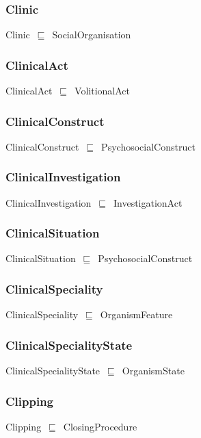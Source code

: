 \documentclass{article}
\begin{document}
\subsubsection*{Clinic}

Clinic~\ensuremath{\sqsubseteq}~SocialOrganisation~

\subsubsection*{ClinicalAct}

ClinicalAct~\ensuremath{\sqsubseteq}~VolitionalAct~

\subsubsection*{ClinicalConstruct}

ClinicalConstruct~\ensuremath{\sqsubseteq}~PsychosocialConstruct~

\subsubsection*{ClinicalInvestigation}

ClinicalInvestigation~\ensuremath{\sqsubseteq}~InvestigationAct~

\subsubsection*{ClinicalSituation}

ClinicalSituation~\ensuremath{\sqsubseteq}~PsychosocialConstruct~

\subsubsection*{ClinicalSpeciality}

ClinicalSpeciality~\ensuremath{\sqsubseteq}~OrganismFeature~

\subsubsection*{ClinicalSpecialityState}

ClinicalSpecialityState~\ensuremath{\sqsubseteq}~OrganismState~

\subsubsection*{Clipping}

Clipping~\ensuremath{\sqsubseteq}~ClosingProcedure~
\end{document}
